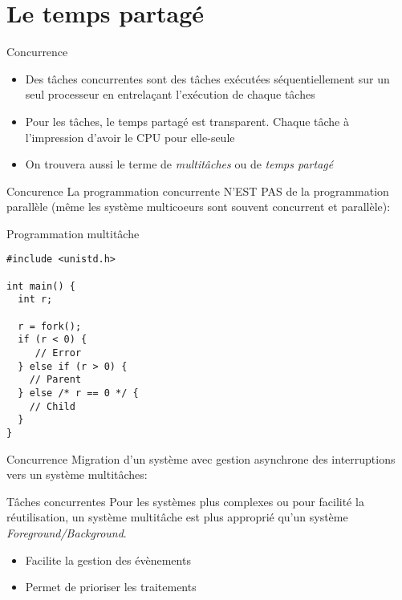 \section{Le temps partagé}

\begin{frame}{Concurrence}
  \begin{itemize}
  \item   Des   tâches   concurrentes   sont   des   tâches   exécutées
    séquentiellement sur un seul processeur en entrelaçant l'exécution
    de chaque tâches
  \item  Pour les tâches,  le temps  partagé est  transparent.  Chaque
    tâche à l'impression d'avoir le CPU pour elle-seule
  \item  On  trouvera aussi  le  terme  de  \emph{multitâches} ou  de
    \emph{temps partagé}
  \end{itemize}
\end{frame}

\begin{frame}{Concurence}
   La programmation concurrente N'EST  PAS de la programmation parallèle
  (même les système multicoeurs sont souvent concurrent et parallèle):
  \begin{center}
  \end{center}
\end{frame}

\begin{frame}[fragile]{Programmation multitâche}
\begin{lstlisting}
#include <unistd.h>

int main() {
  int r;

  r = fork();
  if (r < 0) {
     // Error
  } else if (r > 0) {
    // Parent
  } else /* r == 0 */ {
    // Child
  }
}
\end{lstlisting}
\end{frame}

\begin{frame}{Concurrence}
  Migration d'un système avec gestion asynchrone des interruptions vers
  un système multitâches:
  \begin{center}
  \end{center}
\end{frame}

\begin{frame}{Tâches concurrentes}
  Pour les  systèmes plus complexes ou pour  facilité la réutilisation,
  un   système   multitâche   est   plus   approprié   qu'un   système
  \emph{Foreground/Background}.
  \begin{itemize}
  \item Facilite la gestion des évènements
  \item Permet de prioriser les traitements
  \end{itemize}
\end{frame}

